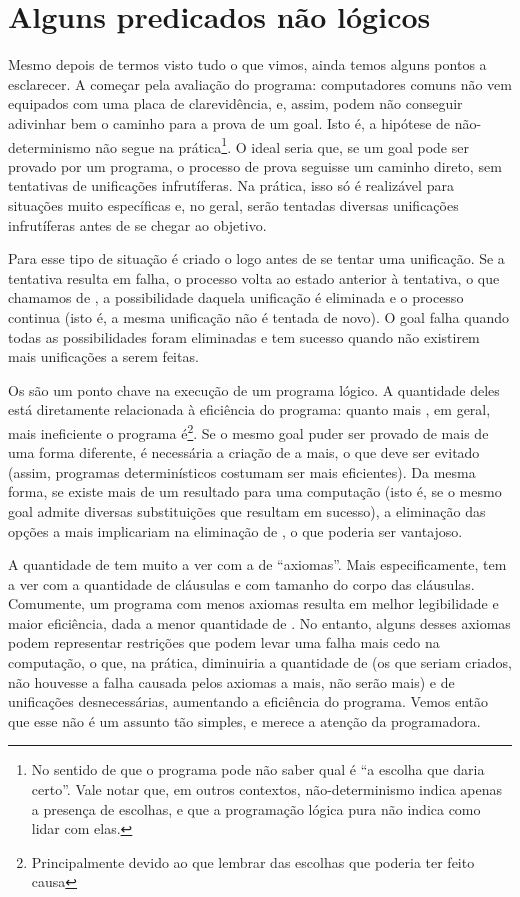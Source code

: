 \documentclass{article}
\begin{document}
\section{Alguns predicados não lógicos}

Mesmo depois de termos visto tudo o que vimos, ainda temos alguns
pontos a esclarecer. A começar pela avaliação do programa:
computadores comuns não vem equipados com uma placa de clarevidência,
e, assim, podem não conseguir adivinhar bem o caminho para a prova de
um goal. Isto é, a hipótese de não-determinismo não segue na
prática\footnote{No sentido de que o programa pode não saber qual é
  ``a escolha que daria certo''. Vale notar que, em outros contextos,
  não-determinismo indica apenas a presença de escolhas, e que a
  programação lógica pura não indica como lidar com elas.}. O ideal
seria que, se um goal pode ser provado por um programa, o processo de
prova seguisse um caminho direto, sem tentativas de unificações
infrutíferas. Na prática, isso só é realizável para situações muito
específicas e, no geral, serão tentadas diversas unificações
infrutíferas antes de se chegar ao objetivo.

Para esse tipo de situação é criado o  logo
antes de se tentar uma unificação. Se a tentativa resulta em falha, o
processo volta ao estado anterior à tentativa, o que chamamos de
, a possibilidade daquela unificação é
eliminada e o processo continua (isto é, a mesma unificação não é
tentada de novo). O goal falha quando todas as possibilidades foram
eliminadas e tem sucesso quando não existirem mais unificações a serem
feitas.

Os  são um ponto chave na execução de um
programa lógico. A quantidade deles está diretamente relacionada à
eficiência do programa: quanto mais , em geral,
mais ineficiente o programa é\footnote{Principalmente devido ao
   que lembrar das escolhas que poderia ter feito
  causa}. Se o mesmo goal puder ser
provado de mais de uma forma diferente, é necessária a criação de
 a mais, o que deve ser evitado (assim,
programas determinísticos costumam ser mais eficientes). Da
mesma forma, se existe mais de um resultado para uma computação (isto
é, se o mesmo goal admite diversas substituições que resultam em
sucesso), a eliminação das opções a mais implicariam na eliminação de
, o que poderia ser vantajoso.

A quantidade de  tem muito a ver com a de
``axiomas''. Mais especificamente, tem a ver com a quantidade de
cláusulas e com tamanho do corpo das cláusulas. Comumente, um
programa com menos axiomas resulta em melhor legibilidade e maior
eficiência, dada a menor quantidade de . No
entanto, alguns desses axiomas podem representar
restrições que podem levar uma falha mais cedo na computação, o que,
na prática, diminuiria a quantidade de  (os que
seriam criados, não houvesse a falha causada pelos axiomas a mais, não serão mais) e de
unificações desnecessárias, aumentando a eficiência do programa. Vemos
então que esse não é um assunto tão simples, e merece a atenção da programadora.
\end{document}

